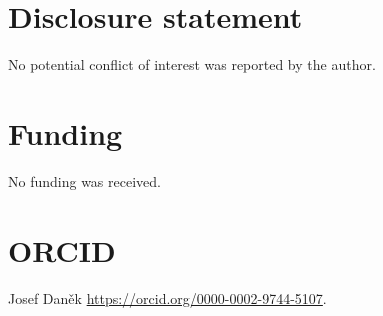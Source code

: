 \documentclass[a4paper,12pt]{article}
\begin{document}
\section*{Disclosure statement} 
No potential conflict of interest was reported by the author.

\section*{Funding}
No funding was received.

\section*{ORCID}
Josef Dan\v{e}k  \href{https://orcid.org/0000-0002-9744-5107}{https://orcid.org/0000-0002-9744-5107}.

% 
%
%
%
\renewcommand*{\bibfont}{\normalsize}
\end{document}
